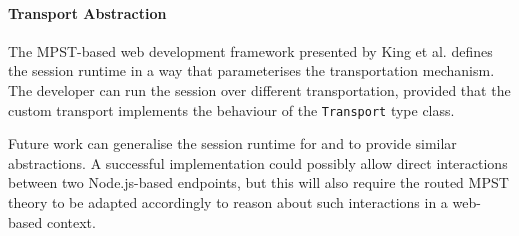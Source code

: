 \paragraph{Transport Abstraction}
The MPST-based web development framework presented by 
King et al. \cite{PureScript2019} defines the session runtime
in a way that parameterises the transportation mechanism.
The developer can run the session over different transportation,
provided that the custom transport implements the behaviour
of the \texttt{Transport} type class.

Future work can generalise the session runtime for 
 and  to provide
similar abstractions. A successful implementation could
possibly allow direct interactions between two Node.js-based
endpoints, but this will also require the routed MPST
theory to be adapted accordingly to reason about
such interactions in a web-based context.

%
